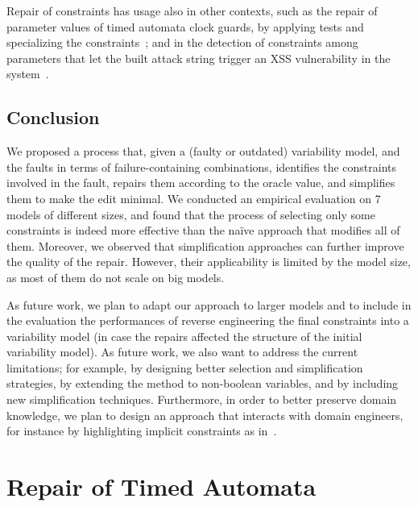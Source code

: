 \begin{tikzborder}{\cite{Gargantini16:validation}}
\begin{tikzborder}{\cite{gargantini_combinatorial_2017}}
\begin{tikzborder}{\cite{garn2019}}
\begin{tikzborder}{\cite{arcaini2019achieving}}
\begin{tikzborder}{\cite{arcaini2019varivolution}}
		Repair of constraints has usage also in other contexts, such as the repair of parameter values of timed automata clock guards, by applying tests and specializing the constraints~\cite{andre_tap_2019}; and in the detection of constraints among parameters that let the built attack string trigger an XSS vulnerability in the system~\cite{garn2019}.\be
		
		\section{Conclusion}\label{sec:fmconclusion}
		
		\bb We proposed a process that, given a (faulty or outdated) variability model, and the faults in terms of failure-containing combinations, identifies the constraints involved in the fault, repairs them according to the oracle value, and simplifies them to make the edit minimal. We conducted an empirical evaluation on 7 models of different sizes, and found that the process of selecting only some constraints is indeed more effective than the na{\"i}ve approach that modifies all of them. Moreover, we observed that simplification approaches can further improve the quality of the repair. However, their applicability is limited by the model size, as most of them do not scale on big models.
		
		As future work, we plan to adapt our approach to larger models and to include in the evaluation the performances of reverse engineering the final constraints into a variability model (in case the repairs affected the structure of the initial variability model). As future work, we also want to address the current limitations; for example, by designing better selection and simplification strategies, by extending the method to non-boolean variables, and by including new simplification techniques. Furthermore, in order to better preserve domain knowledge, we plan to design an approach that interacts with domain engineers, for instance by highlighting implicit constraints as in~\cite{ananieva_implicit_2016}.\be


















\chapter{Repair of Timed Automata}\label{ch:tarepair}


\end{tikzborder}
\end{tikzborder}
\end{tikzborder}
\end{tikzborder}
\end{tikzborder}
